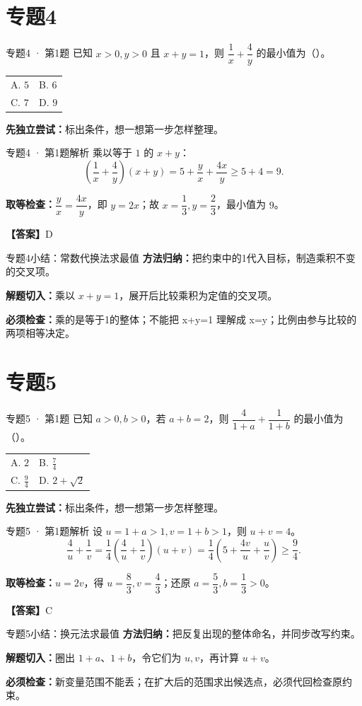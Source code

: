 \documentclass[UTF8,10pt,aspectratio=169]{ctexbeamer}
\makeatletter
\newcommand{\Answer}[1]{\par\vspace{0.2cm}\textbf{【答案】}#1}
\newcommand{\Choices}[4]{\par\vspace{0.2cm}\begin{tabular}{@{}p{0.47\textwidth}p{0.47\textwidth}@{}}A. #1 & B. #2 \\[0.15cm] C. #3 & D. #4\end{tabular}}
\makeatother
\begin{document}
\section{专题4}
\begin{frame}[t]{专题4 · 第1题}
已知 $x>0,y>0$ 且 $x+y=1$，则 $\dfrac1x+\dfrac4y$ 的最小值为（\quad）。
\Choices{$5$}{$6$}{$7$}{$9$}
\par\vspace{0.3cm}\textbf{先独立尝试：}标出条件，想一想第一步怎样整理。
\end{frame}
\begin{frame}[t]{专题4 · 第1题解析}
乘以等于 $1$ 的 $x+y$：\[\left(\frac1x+\frac4y\right)(x+y)=5+\frac yx+\frac{4x}y\ge5+4=9.\]
\pause
\par\vspace{0.2cm}\textbf{取等检查：}$\dfrac{y}{x}=\dfrac{4x}{y}$，即 $y=2x$；故 $x=\dfrac{1}{3},y=\dfrac{2}{3}$，最小值为 $9$。
\Answer{D}
\end{frame}
\begin{frame}[t]{专题4小结：常数代换法求最值}
\textbf{方法归纳：}把约束中的1代入目标，制造乘积不变的交叉项。\par\vspace{0.4cm}
\textbf{解题切入：}乘以 $x+y=1$，展开后比较乘积为定值的交叉项。\par\vspace{0.4cm}
\textbf{必须检查：}乘的是等于1的整体；不能把 x+y=1 理解成 x=y；比例由参与比较的两项相等决定。
\end{frame}
\section{专题5}
\begin{frame}[t]{专题5 · 第1题}
已知 $a>0,b>0$，若 $a+b=2$，则 $\dfrac4{1+a}+\dfrac1{1+b}$ 的最小值为（\quad）。
\Choices{$2$}{$\frac74$}{$\frac94$}{$2+\sqrt2$}
\par\vspace{0.3cm}\textbf{先独立尝试：}标出条件，想一想第一步怎样整理。
\end{frame}
\begin{frame}[t]{专题5 · 第1题解析}
设 $u=1+a>1,v=1+b>1$，则 $u+v=4$。\[\frac4u+\frac1v=\frac14\left(\frac4u+\frac1v\right)(u+v)=\frac14\left(5+\frac{4v}{u}+\frac uv\right)\ge\frac94.\]
\pause
\par\vspace{0.2cm}\textbf{取等检查：}$u=2v$，得 $u=\dfrac{8}{3},v=\dfrac{4}{3}$；还原 $a=\dfrac{5}{3},b=\dfrac{1}{3}>0$。
\Answer{C}
\end{frame}
\begin{frame}[t]{专题5小结：换元法求最值}
\textbf{方法归纳：}把反复出现的整体命名，并同步改写约束。\par\vspace{0.4cm}
\textbf{解题切入：}圈出 $1+a$、$1+b$，令它们为 $u,v$，再计算 $u+v$。\par\vspace{0.4cm}
\textbf{必须检查：}新变量范围不能丢；在扩大后的范围求出候选点，必须代回检查原约束。
\end{frame}
\end{document}
